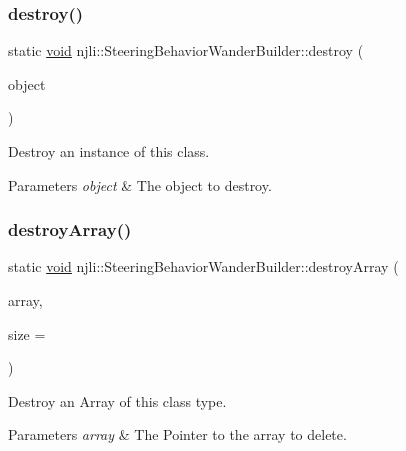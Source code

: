\subsubsection{\texorpdfstring{destroy()}{destroy()}}
{\footnotesize\ttfamily static \mbox{\hyperlink{_thread_8h_af1e856da2e658414cb2456cb6f7ebc66}{void}} njli\+::\+Steering\+Behavior\+Wander\+Builder\+::destroy (\begin{DoxyParamCaption}\item[{\mbox{\hyperlink{classnjli_1_1_steering_behavior_wander_builder}{Steering\+Behavior\+Wander\+Builder}} $\ast$}]{object }\end{DoxyParamCaption})\hspace{0.3cm}{\ttfamily [static]}}

Destroy an instance of this class.


\begin{DoxyParams}{Parameters}
{\em object} & The object to destroy. \\
\hline
\end{DoxyParams}
\mbox{\label{classnjli_1_1_steering_behavior_wander_builder_af5a2a240a478b5ea5f5a27e73fc27004}} 
\subsubsection{\texorpdfstring{destroy\+Array()}{destroyArray()}}
{\footnotesize\ttfamily static \mbox{\hyperlink{_thread_8h_af1e856da2e658414cb2456cb6f7ebc66}{void}} njli\+::\+Steering\+Behavior\+Wander\+Builder\+::destroy\+Array (\begin{DoxyParamCaption}\item[{\mbox{\hyperlink{classnjli_1_1_steering_behavior_wander_builder}{Steering\+Behavior\+Wander\+Builder}} $\ast$$\ast$}]{array,  }\item[{const \mbox{\hyperlink{_util_8h_a10e94b422ef0c20dcdec20d31a1f5049}{u32}}}]{size = {} }\end{DoxyParamCaption})\hspace{0.3cm}{\ttfamily [static]}}

Destroy an Array of this class type.


\begin{DoxyParams}{Parameters}
{\em array} & The Pointer to the array to delete. \\
\hline
\end{DoxyParams}
\mbox{\label{classnjli_1_1_steering_behavior_wander_builder_aca98c095d79ec38cec510f9e5082ebd5}} 
